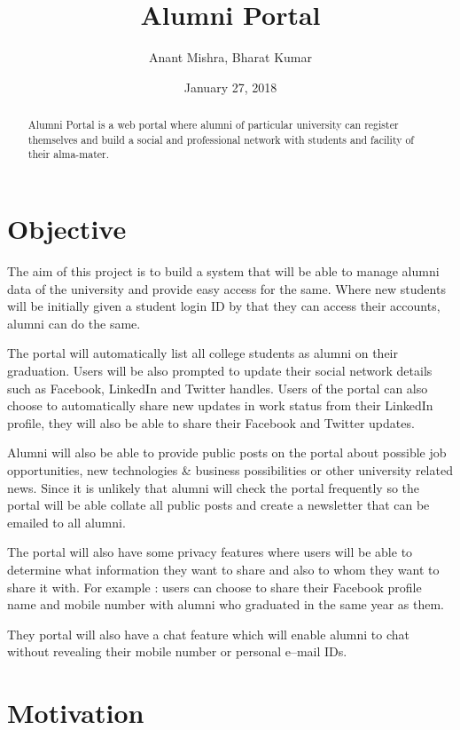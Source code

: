 \documentclass[a4paper]{article}
\title{Alumni Portal}
\author{Anant Mishra, Bharat Kumar }
\date {January 27, 2018}
\begin{document}
\maketitle

\begin{abstract}
Alumni Portal is a web portal where alumni of particular university can register themselves and build a social and professional network with students and facility of their alma-mater.
\end{abstract}

\section{Objective}

The aim of this project is to build a system that will be able to manage alumni data of the university and provide easy access for the same. Where new students will be initially given a student login ID by that they can access their accounts, alumni can do the same. 
    
    The portal will automatically list all college students as alumni on their graduation. Users will be also prompted to update their social network details such as Facebook, LinkedIn and Twitter handles. Users of the portal can also choose to automatically share new updates in work status from their LinkedIn profile, they will also be able to share their Facebook and Twitter updates. 
    
	Alumni will also be able to provide public posts on the portal about possible job opportunities, new technologies \& business possibilities or other university related news. Since it is unlikely that alumni will check the portal frequently so the portal will be able collate all public posts and create a newsletter that can be emailed to all alumni.
    
	The portal will also have some privacy features where users will be able to determine what information they want to share and also to whom they want to share it with. For example : users can choose to share their Facebook profile name and mobile number with alumni who graduated in the same year as them. 
    
    They portal will also have a chat feature which will enable alumni to chat without revealing their mobile number or personal e–mail IDs. 

\section{Motivation}
\end{document}
